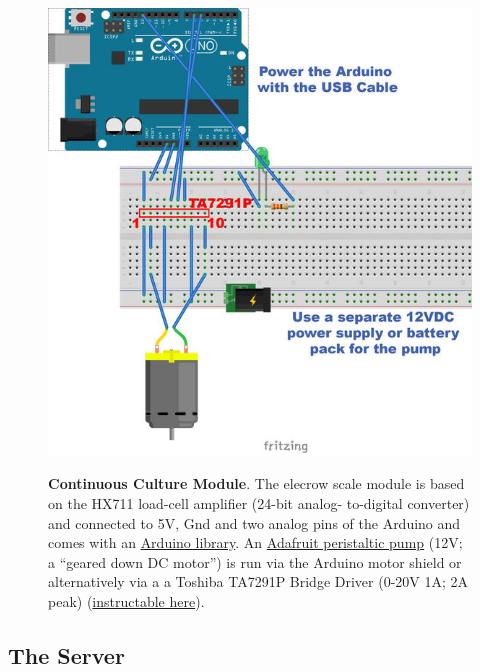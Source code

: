\documentclass[12pt,a4paper]{scrartcl}
\begin{document}
\begin{figure}[ht]
\begin{minipage}{.5\textwidth}
{      \includegraphics[width=\textwidth]{figures/pump_fritzing.png}
    }
  \end{minipage}
\caption[]{\textbf{Continuous Culture Module}. The elecrow scale
  module is based on the HX711 load-cell amplifier (24-bit analog-
  to-digital converter) and connected to 5V, Gnd and two analog pins
  of the Arduino and comes with an
  \href{http://www.elecrow.com/wiki/index.php?title=Weight_Sensor_Scales_Kit-_20KG}{Arduino
    library}. An \href{https://www.adafruit.com/product/1150}{Adafruit
    peristaltic pump} (12V; a ``geared down DC motor'') is run via
  the Arduino motor shield or alternatively via a a Toshiba TA7291P
  Bridge Driver (0-20V 1A; 2A peak)
  (\href{http://www.instructables.com/id/Control-peristaltic-pump-with-TA7291P-and-an-Ardui/}{instructable
    here}). }
\end{figure}

\clearpage
\subsection{The Server}
\end{document}
